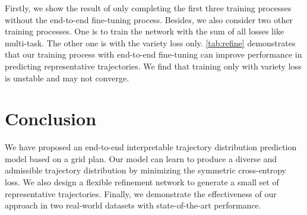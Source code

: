 \documentclass[10pt,twocolumn,letterpaper]{article}
\begin{document}
 Firstly, we show the result of only completing the first three training processes without the end-to-end fine-tuning process. Besides, we also consider two other training processes. One is to train the network with the sum of all losses like multi-task. The other one is with the variety loss only. \cref{tab:refine} demonstrates that our training process with end-to-end fine-tuning can improve performance in predicting representative trajectories. We find that training only with variety loss is unstable and may not converge. 


\section{Conclusion}
\label{sec:conclusion}

We have proposed an end-to-end interpretable trajectory distribution prediction model based on a grid plan. Our model can learn to produce a diverse and admissible trajectory distribution by minimizing the symmetric cross-entropy loss. We also design a flexible refinement network to generate a small set of representative trajectories. Finally, we demonstrate the effectiveness of our approach in two real-world datasets with state-of-the-art performance.



















\clearpage
{\small


}
\end{document}
